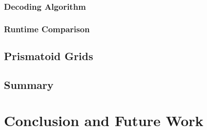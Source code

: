 \documentclass[12pt]{ucalgthes1}
\begin{document}
\subsection{Decoding Algorithm}
\subsection{Runtime Comparison}
\section{Prismatoid Grids}
\section{Summary}

\chapter{Conclusion and Future Work}

\appendix



\nocite{*}

\end{document}

